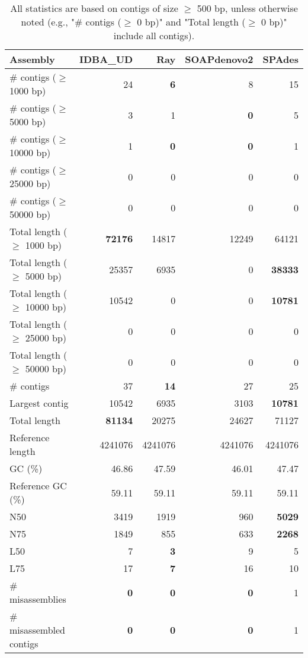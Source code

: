 \documentclass[12pt,a4paper]{article}
\begin{document}
\begin{table}[ht]
\begin{center}
\caption{All statistics are based on contigs of size $\geq$ 500 bp, unless otherwise noted (e.g., "\# contigs ($\geq$ 0 bp)" and "Total length ($\geq$ 0 bp)" include all contigs).}
\begin{tabular}{|l*{4}{|r}|}
\hline
Assembly & IDBA\_UD & Ray & SOAPdenovo2 & SPAdes \\ \hline
\# contigs ($\geq$ 1000 bp) & 24 & {\bf 6} & 8 & 15 \\ \hline
\# contigs ($\geq$ 5000 bp) & 3 & 1 & {\bf 0} & 5 \\ \hline
\# contigs ($\geq$ 10000 bp) & 1 & {\bf 0} & {\bf 0} & 1 \\ \hline
\# contigs ($\geq$ 25000 bp) & 0 & 0 & 0 & 0 \\ \hline
\# contigs ($\geq$ 50000 bp) & 0 & 0 & 0 & 0 \\ \hline
Total length ($\geq$ 1000 bp) & {\bf 72176} & 14817 & 12249 & 64121 \\ \hline
Total length ($\geq$ 5000 bp) & 25357 & 6935 & 0 & {\bf 38333} \\ \hline
Total length ($\geq$ 10000 bp) & 10542 & 0 & 0 & {\bf 10781} \\ \hline
Total length ($\geq$ 25000 bp) & 0 & 0 & 0 & 0 \\ \hline
Total length ($\geq$ 50000 bp) & 0 & 0 & 0 & 0 \\ \hline
\# contigs & 37 & {\bf 14} & 27 & 25 \\ \hline
Largest contig & 10542 & 6935 & 3103 & {\bf 10781} \\ \hline
Total length & {\bf 81134} & 20275 & 24627 & 71127 \\ \hline
Reference length & 4241076 & 4241076 & 4241076 & 4241076 \\ \hline
GC (\%) & 46.86 & 47.59 & 46.01 & 47.47 \\ \hline
Reference GC (\%) & 59.11 & 59.11 & 59.11 & 59.11 \\ \hline
N50 & 3419 & 1919 & 960 & {\bf 5029} \\ \hline
N75 & 1849 & 855 & 633 & {\bf 2268} \\ \hline
L50 & 7 & {\bf 3} & 9 & 5 \\ \hline
L75 & 17 & {\bf 7} & 16 & 10 \\ \hline
\# misassemblies & {\bf 0} & {\bf 0} & {\bf 0} & 1 \\ \hline
\# misassembled contigs & {\bf 0} & {\bf 0} & {\bf 0} & 1 \\ \hline

\end{tabular}
\end{center}
\end{table}
\end{document}
